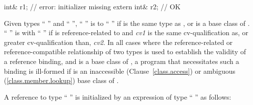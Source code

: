 \begin{codeblock}
int& r1;                        // error: initializer missing
extern int& r2;                 // OK
\end{codeblock}
\exitexample

\pnum
Given types `` '' and `` '',
`` '' is  to
%
`` '' if
is the same type as
,
or
is a base class of
.
`` '' is 
%
with `` '' if
is reference-related to
and
\textit{cv1}
is the same cv-qualification as, or greater cv-qualification than,
\textit{cv2}.
In all cases where the reference-related or reference-compatible relationship
of two types is used to establish the validity of a reference binding, and
is a base class of
,
a program that necessitates such a binding is ill-formed if
is an inaccessible (Clause~\ref{class.access}) or ambiguous (\ref{class.member.lookup})
base class of
.

\pnum
A reference to type `` '' is initialized by
an expression of type `` '' as follows:%

